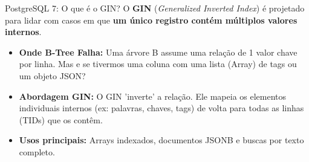 \documentclass[9pt]{beamer}
\begin{document}
\begin{frame}{PostgreSQL 7: O que é o GIN?}
    O \textbf{GIN} (\textit{Generalized Inverted Index}) é projetado para lidar com casos em que \textbf{um único registro contém múltiplos valores internos}.
    
    \vspace{0.3cm}
    \begin{itemize}
        \item \textbf{Onde B-Tree Falha:} Uma árvore B assume uma relação de 1 valor chave por linha. Mas e se tivermos uma coluna com uma lista (Array) de tags ou um objeto JSON?
        \item \textbf{Abordagem GIN:} O GIN 'inverte' a relação. Ele mapeia os elementos individuais internos (ex: palavras, chaves, tags) de volta para todas as linhas (TIDs) que os contêm.
        \item \textbf{Usos principais:} Arrays indexados, documentos JSONB e buscas por texto completo.
    \end{itemize}
\end{frame}
\end{document}
